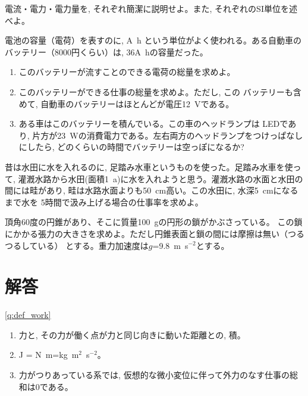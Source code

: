 \begin{q}\label{eq:def_electricity} 電流・電力・電力量を, 
それぞれ簡潔に説明せよ。また, それぞれのSI単位を述べよ。
\end{q}\mv


\begin{q}\label{eq:battery_Ah} 電池の容量（電荷）を表すのに, A~h
という単位がよく使われる。ある自動車のバッテリー（8000円くらい）は, 
36A~hの容量だった。
\begin{enumerate}
\item このバッテリーが流すことのできる電荷の総量を求めよ。
\item このバッテリーができる仕事の総量を求めよ。ただし, この
バッテリーも含めて, 自動車のバッテリーはほとんどが電圧12~Vである。
\item ある車はこのバッテリーを積んでいる。この車のヘッドランプは
LEDであり, 片方が23~Wの消費電力である。左右両方のヘッドランプをつけっぱなし
にしたら, どのくらいの時間でバッテリーは空っぽになるか?
\end{enumerate}
\end{q}
\hv

\begin{exq} 昔は水田に水を入れるのに, 足踏み水車というものを使った。足踏み水車を使って, 
灌漑水路から水田(面積1~a)に水を入れようと思う。灌漑水路の水面と水田の
間には畦があり, 畦は水路水面よりも50~cm高い。この水田に, 水深5~cmになるまで水を
5時間で汲み上げる場合の仕事率を求めよ。\end{exq}

\begin{exq} 頂角60度の円錐があり、そこに質量100~gの円形の鎖がかぶさっている。
この鎖にかかる張力の大きさを求めよ。ただし円錐表面と鎖の間には摩擦は無い（つるつるしている）
とする。重力加速度は$g$=9.8~m~s$^{-2}$とする。\end{exq}


\section{解答}
% 
\ref{q:def_work}
\begin{enumerate}
\item 力と, その力が働く点が力と同じ向きに動いた距離との, 積。
\item J = N~m=kg~m$^2$~s$^{-2}$。
\item 力がつりあっている系では, 仮想的な微小変位に伴って外力のなす仕事の総和は0である。
\end{enumerate}
\vspace{0.2cm}

